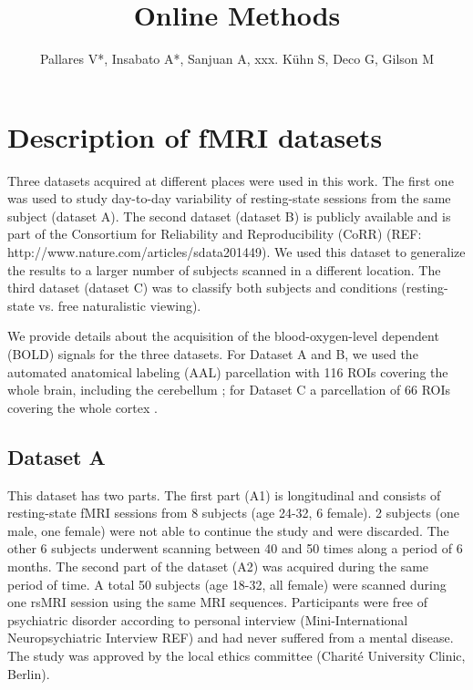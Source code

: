 \documentclass{article}
\begin{document}
\title{Online Methods}

\author{Pallares V*, Insabato A*, Sanjuan A, xxx. K{\"u}hn S, Deco G, Gilson M}

\maketitle

\section{Description of fMRI datasets}

Three datasets acquired at different places were used in this work. The first one was used to study day-to-day variability of resting-state sessions from the same subject (dataset A). The second dataset (dataset B) is publicly available and is part of the Consortium for Reliability and Reproducibility (CoRR) (REF: http://www.nature.com/articles/sdata201449). We used this dataset to generalize the results to a larger number of subjects scanned in a different location. The third dataset (dataset C) was to classify both subjects and conditions (resting-state vs. free naturalistic viewing).

We provide details about the acquisition of the blood-oxygen-level dependent (BOLD) signals for the three datasets. 
For Dataset A and B, we used the automated anatomical labeling (AAL) parcellation with 116 ROIs covering the whole brain, including the cerebellum \cite{Tzourio2002}; for Dataset C a parcellation of 66 ROIs covering the whole cortex \cite{Hagmann_PB_2008}.

\subsection{Dataset A}

This dataset has two parts. The first part (A1) is longitudinal and consists of resting-state fMRI sessions from 8 subjects (age 24-32, 6 female). 2 subjects (one male, one female) were not able to continue the study and were discarded. The other 6 subjects underwent scanning between 40 and 50 times along a period of 6 months. The second part of the dataset (A2) was acquired during the same period of time. A total 50 subjects (age 18-32, all female) were scanned during one rsMRI session using the same MRI sequences. Participants were free of psychiatric disorder according to personal interview (Mini-International Neuropsychiatric Interview REF) and had never suffered from a mental disease. The study was approved by the local ethics committee (Charit{\'e} University Clinic, Berlin). 
\end{document}
